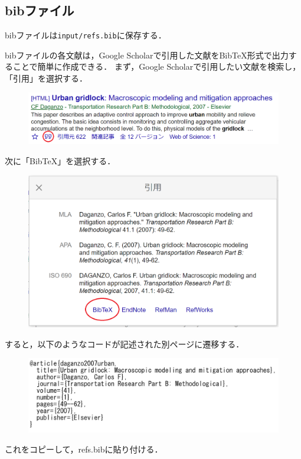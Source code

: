\documentclass[../main/main]{subfiles}
\begin{document}
\subsection{bibファイル}
bibファイルは\verb|input/refs.bib|に保存する．
\par
bibファイルの各文献は，Google Scholarで引用した文献をBibTeX形式で出力することで簡単に作成できる．
まず，Google Scholarで引用したい文献を検索し，「引用」を選択する．
\begin{figure}[!ht]
  \centering
  \includegraphics[clip, width=0.5\columnwidth]{image/bib1.png}
  \label{fig:bib1}
\end{figure}
\par
次に「BibTeX」を選択する．
\begin{figure}[!ht]
  \centering
  \includegraphics[clip, width=0.5\columnwidth]{image/bib2.png}
  \label{fig:bib1}
\end{figure}
\par
すると，以下のようなコードが記述された別ページに遷移する．
\begin{figure}[!ht]
  \centering
  \includegraphics[clip, width=0.5\columnwidth]{image/bib3.png}
  \label{fig:bib1}
\end{figure}
\par
これをコピーして，refs.bibに貼り付ける．
\end{document}
